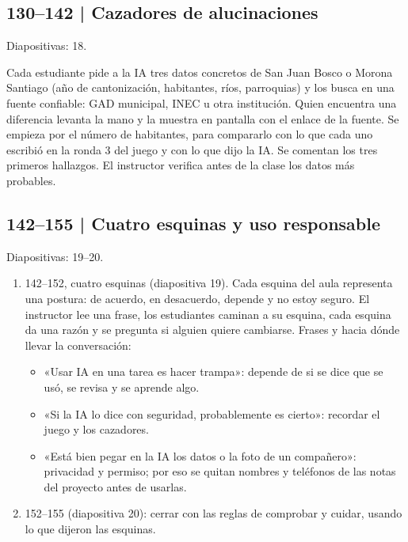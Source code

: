 \documentclass[11pt,a4paper]{article}
\newcommand{\diapos}[1]{\textcolor{gris}{\small\textsf{Diapositivas: #1}}\par}
\begin{document}
\subsection{130--142 | Cazadores de alucinaciones}
\diapos{18.}
Cada estudiante pide a la IA tres datos concretos de San Juan Bosco o Morona Santiago (año de cantonización, habitantes, ríos, parroquias) y los busca en una fuente confiable: GAD municipal, INEC u otra institución. Quien encuentra una diferencia levanta la mano y la muestra en pantalla con el enlace de la fuente. Se empieza por el número de habitantes, para compararlo con lo que cada uno escribió en la ronda 3 del juego y con lo que dijo la IA. Se comentan los tres primeros hallazgos. El instructor verifica antes de la clase los datos más probables.

\subsection{142--155 | Cuatro esquinas y uso responsable}
\diapos{19--20.}
\begin{enumerate}
\item 142--152, cuatro esquinas (diapositiva 19). Cada esquina del aula representa una postura: de acuerdo, en desacuerdo, depende y no estoy seguro. El instructor lee una frase, los estudiantes caminan a su esquina, cada esquina da una razón y se pregunta si alguien quiere cambiarse. Frases y hacia dónde llevar la conversación:
  \begin{itemize}
  \item «Usar IA en una tarea es hacer trampa»: depende de si se dice que se usó, se revisa y se aprende algo.
  \item «Si la IA lo dice con seguridad, probablemente es cierto»: recordar el juego y los cazadores.
  \item «Está bien pegar en la IA los datos o la foto de un compañero»: privacidad y permiso; por eso se quitan nombres y teléfonos de las notas del proyecto antes de usarlas.
  \end{itemize}
\item 152--155 (diapositiva 20): cerrar con las reglas de comprobar y cuidar, usando lo que dijeron las esquinas.
\end{enumerate}
\end{document}
